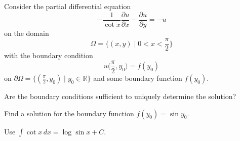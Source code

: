 Consider the partial differential equation
\begin{equation}
-\frac{1}{\cot x}\frac{\partial u}{\partial x}
-
\frac{\partial u}{\partial y}
=
-u
\label{30000024:eqn}
\end{equation}
on the domain
\[
\Omega
=
\biggl\{(x,y)\;\bigg|\; 0 < x < \frac{\pi}2 \biggr\}
\]
with the boundary condition
\[
u\biggl(\frac{\pi}2,y_0\biggr)
=
f(y_0)
\]
on $\partial\Omega = \{(\frac{\pi}2,y_0)\mid y_0\in\mathbb{R}\}$ and
some boundary function $f(y_0)$.
\begin{teilaufgaben}
\item
Are the boundary conditions sufficient to uniquely determine the solution?
\item
Find a solution for the boundary function $f(y_0) = \sin y_0$.
\end{teilaufgaben}

\begin{hinweis}
Use $\int\cot x\,dx = \log\sin x+C$.
\end{hinweis}


